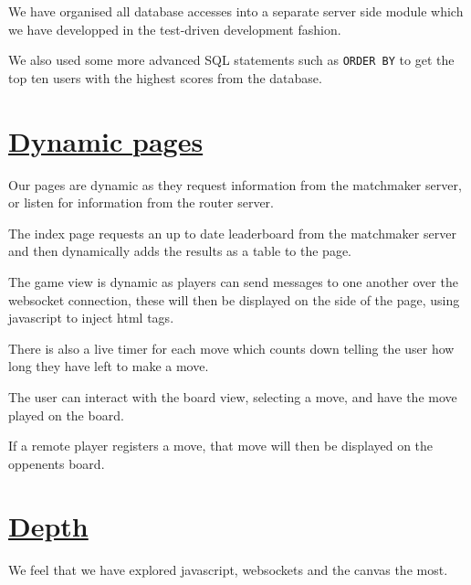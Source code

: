 \documentclass{article}
\begin{document}
    \indent We have organised all database accesses into a separate server side module which we have developped in the test-driven
    development fashion.

    \indent We also used some more advanced SQL statements such as \verb|ORDER BY| to get the top ten users with the highest scores from the database.
\section{\underline{Dynamic pages}}\label{sec:DynamicPages}
    Our pages are dynamic as they request information from the matchmaker server, or listen for information from the router server.

    \indent The index page requests an up to date leaderboard from the matchmaker server and then dynamically adds the results as a table to the page.

    \indent The game view is dynamic as players can send messages to one another over the websocket connection, these will then be displayed on the side of the page,
    using javascript to inject html tags.

    \indent There is also a live timer for each move which counts down telling the user how long they have left to make a move.

    \indent The user can interact with the board view, selecting a move, and have the move played on the board.

    \indent If a remote player registers a move, that move will then be displayed on the oppenents board.
\section{\underline{Depth}}\label{sec:Depth}
    We feel that we have explored javascript, websockets and the canvas the most.
\end{document}

